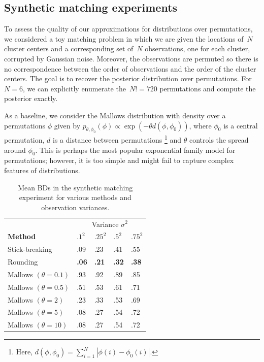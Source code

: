 \documentclass[twoside]{article}
\begin{document}

 \subsection{Synthetic matching experiments}
 To assess the quality of our approximations for distributions over
 permutations, we considered a toy matching problem in which we are given the locations of~$N$ cluster centers and a corresponding set of~$N$
 observations, one for each cluster, corrupted by Gaussian noise.
 Moreover, the observations are permuted so there is no correspondence
 between the order of observations and the order of the cluster centers.
 The goal is to recover the posterior distribution over permutations.
 For~$N=6$, we can explicitly enumerate the~$N!=720$ permutations and
 compute the posterior exactly. 
 
 As a baseline, we consider the Mallows distribution  \cite{Mallows1957} with density over a permutations $\phi$ given by $p_{\theta, \phi_0}(\phi)\propto \exp(-\theta d(\phi,\phi_0))$, where $\phi_0$ is a central permutation, $d$ is a distance between permutations \footnote{Here, $d(\phi,\phi_0)=\sum_{i=1}^N |\phi(i)-\phi_0(i)|$.} and $\theta$ controls the spread around $\phi_0$. This is perhaps the most popular exponential family model for permutations; however, it is too simple and might fail to capture complex features of distributions.

 \begin{table}[h]
  \caption{Mean BDs in the synthetic matching experiment for various methods and observation variances.}
  \label{table:BDs}
  \centering
  \begin{tabular}{lllll}
    & \multicolumn{4}{c}{Variance $\sigma^2$} \\
    \cmidrule(lr){3-4} 
    \textbf{Method} & $.1^2$ & $.25^2$ & $.5^2$ & $.75^2$ \\
    \hline
    Stick-breaking & .09 & .23 & .41 & .55 \\
    Rounding & \textbf{.06} & \textbf{.21}  & \textbf{.32}  & \textbf{.38} \\
    Mallows $(\theta=0.1)$ & .93 & .92 & .89  & .85 \\
    Mallows $(\theta=0.5)$ & .51 & .53  & .61 & .71 \\
    Mallows $(\theta=2)$ & .23 & .33 & .53  & .69 \\
    Mallows $(\theta=5)$ & .08 & .27 & .54 & .72 \\
    Mallows $(\theta=10)$ & .08 & .27 & .54  & .72 \\
    \bottomrule
  \end{tabular}
\end{table}
\end{document}
